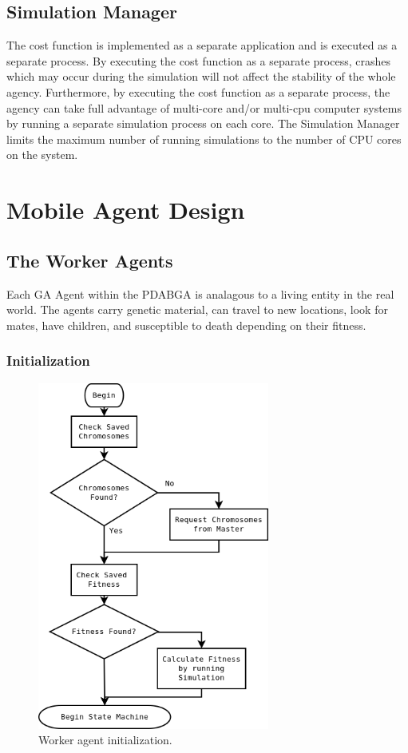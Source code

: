     \subsection{Simulation Manager} %
      The cost function is implemented as a separate application and is executed
        as a separate process. 
      By executing the cost function as a separate process, crashes which may occur
        during the simulation will not affect the stability of the whole agency. 
      Furthermore, by executing the cost function as a separate process, the agency
        can take full advantage of multi-core and/or multi-cpu computer systems by
        running a separate simulation process on each core. 
      The Simulation Manager limits the maximum number of running simulations to the
        number of CPU cores on the system.

  \section{Mobile Agent Design} %
    \subsection{The Worker Agents} %
    Each GA Agent within the PDABGA is analagous to a living entity in the real world.
    The agents carry genetic material, can travel to new locations, look for
      mates, have children, and susceptible to death depending on their fitness.
    \subsubsection{Initialization} %
      \begin{figure}[!ht]
      \begin{center}
         \includegraphics[width=3in]{figures/worker_agent_init}
      \end{center}
      \caption{\label{fig:worker_agent_init}Worker agent initialization.}
      \end{figure}

